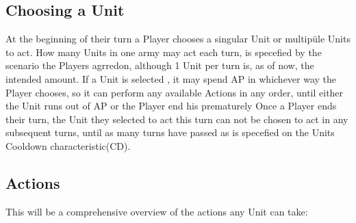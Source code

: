 \documentclass[a4paper,12pt]{book}
\begin{document}
\subsection{Choosing a Unit}
At the beginning of their turn a Player chooses a singular Unit or multipüle Units to act. How many Units in one army may act each turn, is specefied by the scenario the Players agrredon, although 1 Unit per turn is, as of now, the intended amount. If a Unit is selected , it may spend AP in whichever way the Player chooses, so it can perform any available Actions in any order, until either the Unit runs out of AP or the Player end his prematurely Once a Player ends their turn, the Unit they selected to act this turn can not be chosen to act in any subsequent turns, until as many turns have passed as is specefied on the Units Cooldown characteristic(CD).\\

\subsection{Actions}

This will be a comprehensive overview of the actions any Unit can take:
\end{document}
